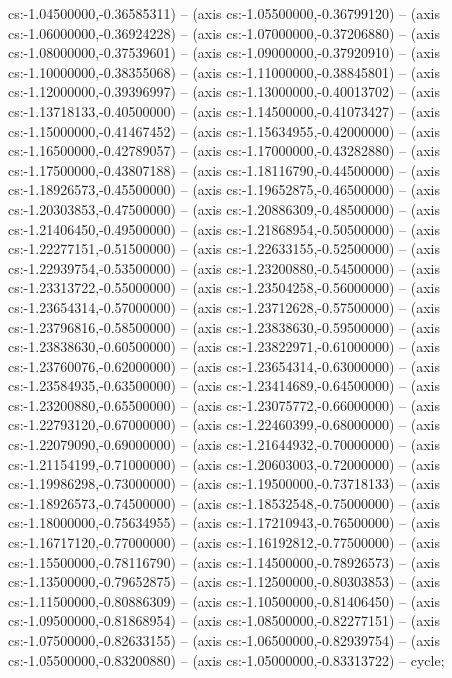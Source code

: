 cs:-1.04500000,-0.36585311) -- (axis cs:-1.05500000,-0.36799120) -- (axis cs:-1.06000000,-0.36924228) -- (axis cs:-1.07000000,-0.37206880) -- (axis cs:-1.08000000,-0.37539601) -- (axis cs:-1.09000000,-0.37920910) -- (axis cs:-1.10000000,-0.38355068) -- (axis cs:-1.11000000,-0.38845801) -- (axis cs:-1.12000000,-0.39396997) -- (axis cs:-1.13000000,-0.40013702) -- (axis cs:-1.13718133,-0.40500000) -- (axis cs:-1.14500000,-0.41073427) -- (axis cs:-1.15000000,-0.41467452) -- (axis cs:-1.15634955,-0.42000000) -- (axis cs:-1.16500000,-0.42789057) -- (axis cs:-1.17000000,-0.43282880) -- (axis cs:-1.17500000,-0.43807188) -- (axis cs:-1.18116790,-0.44500000) -- (axis cs:-1.18926573,-0.45500000) -- (axis cs:-1.19652875,-0.46500000) -- (axis cs:-1.20303853,-0.47500000) -- (axis cs:-1.20886309,-0.48500000) -- (axis cs:-1.21406450,-0.49500000) -- (axis cs:-1.21868954,-0.50500000) -- (axis cs:-1.22277151,-0.51500000) -- (axis cs:-1.22633155,-0.52500000) -- (axis cs:-1.22939754,-0.53500000) -- (axis cs:-1.23200880,-0.54500000) -- (axis cs:-1.23313722,-0.55000000) -- (axis cs:-1.23504258,-0.56000000) -- (axis cs:-1.23654314,-0.57000000) -- (axis cs:-1.23712628,-0.57500000) -- (axis cs:-1.23796816,-0.58500000) -- (axis cs:-1.23838630,-0.59500000) -- (axis cs:-1.23838630,-0.60500000) -- (axis cs:-1.23822971,-0.61000000) -- (axis cs:-1.23760076,-0.62000000) -- (axis cs:-1.23654314,-0.63000000) -- (axis cs:-1.23584935,-0.63500000) -- (axis cs:-1.23414689,-0.64500000) -- (axis cs:-1.23200880,-0.65500000) -- (axis cs:-1.23075772,-0.66000000) -- (axis cs:-1.22793120,-0.67000000) -- (axis cs:-1.22460399,-0.68000000) -- (axis cs:-1.22079090,-0.69000000) -- (axis cs:-1.21644932,-0.70000000) -- (axis cs:-1.21154199,-0.71000000) -- (axis cs:-1.20603003,-0.72000000) -- (axis cs:-1.19986298,-0.73000000) -- (axis cs:-1.19500000,-0.73718133) -- (axis cs:-1.18926573,-0.74500000) -- (axis cs:-1.18532548,-0.75000000) -- (axis cs:-1.18000000,-0.75634955) -- (axis cs:-1.17210943,-0.76500000) -- (axis cs:-1.16717120,-0.77000000) -- (axis cs:-1.16192812,-0.77500000) -- (axis cs:-1.15500000,-0.78116790) -- (axis cs:-1.14500000,-0.78926573) -- (axis cs:-1.13500000,-0.79652875) -- (axis cs:-1.12500000,-0.80303853) -- (axis cs:-1.11500000,-0.80886309) -- (axis cs:-1.10500000,-0.81406450) -- (axis cs:-1.09500000,-0.81868954) -- (axis cs:-1.08500000,-0.82277151) -- (axis cs:-1.07500000,-0.82633155) -- (axis cs:-1.06500000,-0.82939754) -- (axis cs:-1.05500000,-0.83200880) -- (axis cs:-1.05000000,-0.83313722) -- cycle;
